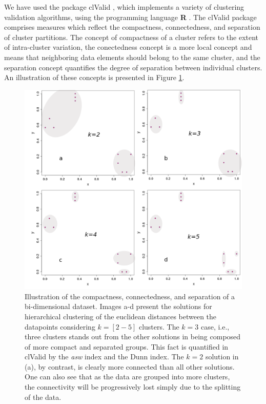 We have used the  package clValid \cite{brock2008}, which implements a
variety  of clustering  validation algorithms,  using  the programming
language  \textbf{R}  \cite{rcite}.   The  clValid  package  comprises
measures which reflect  the compactness, connectedness, and separation
of cluster partitions. The concept  of compactness of a cluster refers
to the extent of  intra-cluster variation, the conectedness concept is
a more local  concept and means that neighboring  data elements should
belong to the same cluster,  and the separation concept quantifies the
degree of  separation between individual clusters.  An illustration of
these concepts is presented in Figure \ref{fig:concomsep}.

\begin{figure}
\centering
\includegraphics[scale=0.36]{Appendix/consilcom.png}
\caption{Illustration   of   the   compactness,   connectedness,   and
  separation  of  a bi-dimensional  dataset.  Images  a-d present  the
  solutions  for hierarchical  clustering of  the  euclidean distances
  between  the datapoints considering  $k=[2-5]$ clusters.   The $k=3$
  case, i.e.,  three clusters stands  out from the other  solutions in
  being composed of  more compact and separated groups.   This fact is
  quantified in clValid by the  \textit{asw} index and the Dunn index.
  The $k=2$  solution in (a),  by contrast, is clearly  more connected
  than all  other solutions.  One can  also see that  as the  data are
  grouped into  more clusters, the connectivity  will be progressively
  lost simply due to the splitting of the data.}
\label{fig:concomsep}
\end{figure}  

